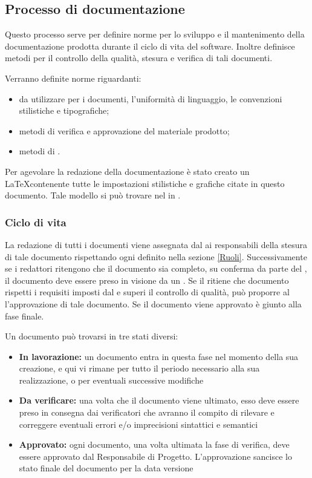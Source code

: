\documentclass[12pt,a4paper]{article}
\begin{document}
\subsection{Processo di documentazione}\label{Documentazione}
Questo processo serve per definire norme per lo sviluppo e il mantenimento della documentazione prodotta durante il ciclo di vita del software. Inoltre definisce metodi per il controllo della qualità, stesura e verifica di tali documenti.

Verranno definite norme riguardanti:
\begin{itemize}
	\item {} da utilizzare per i documenti, l'uniformità di linguaggio, le convenzioni stilistiche e tipografiche;
	\item metodi di verifica e approvazione del materiale prodotto;
	\item metodi di .
\end{itemize}

Per agevolare la redazione della documentazione è stato creato un  \LaTeX contenente tutte le impostazioni stilistiche e grafiche citate in questo documento. Tale modello si può trovare nel  in .

\subsubsection{Ciclo di vita}
La redazione di tutti i documenti viene assegnata dal \PM{} ai responsabili della stesura di tale documento rispettando ogni  definito nella sezione \ref{Ruoli}. Successivamente se i redattori ritengono che il documento sia completo, su conferma da parte del \PM, il documento deve essere preso in visione da un \VR. Se il \VR{} ritiene che documento rispetti i requisiti imposti dal \PR{} e superi il controllo di qualità, può proporre al \PM{} l'approvazione di tale documento. Se il documento viene approvato è giunto alla fase finale.

Un documento può trovarsi in tre stati diversi:
\begin{itemize}
	\item \textbf{In lavorazione:} un documento entra in questa fase nel momento della sua creazione, e qui vi rimane per tutto il periodo necessario alla sua realizzazione, o per eventuali successive modifiche
	\item \textbf{Da verificare:} una volta che il documento viene ultimato, esso deve essere preso in consegna dai verificatori che avranno il compito di rilevare e correggere eventuali errori e/o imprecisioni sintattici e semantici
	\item \textbf{Approvato:} ogni documento, una volta ultimata la fase di verifica, deve essere approvato dal Responsabile di Progetto. L’approvazione sancisce lo stato finale del documento per la data versione
\end{itemize}
\end{document}
